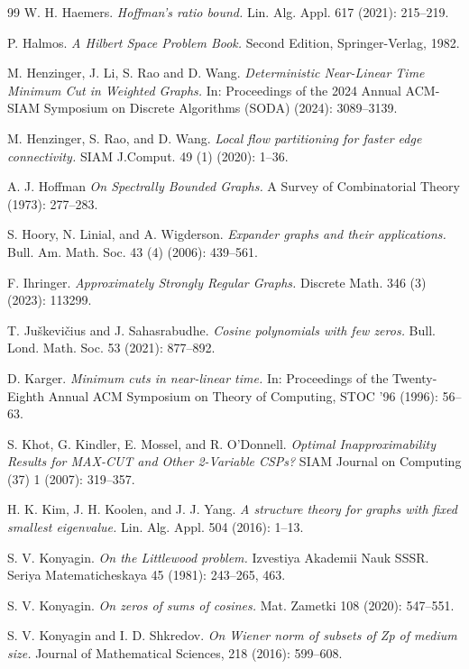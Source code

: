 \documentclass[11pt]{article}
\theoremstyle{plain}
\theoremstyle{definition}
\begin{document}
\begin{thebibliography}{99}
W. H. Haemers. 
\emph{Hoffman's ratio bound.}
Lin. Alg. Appl. 617 (2021): 215--219.

P. Halmos.
\emph{A Hilbert Space Problem Book.}
Second Edition, Springer-Verlag, 1982.

M. Henzinger, J. Li, S. Rao and D. Wang. 
\emph{Deterministic Near-Linear Time Minimum Cut
in Weighted Graphs.}
In: Proceedings of the 2024 Annual ACM-SIAM Symposium on Discrete Algorithms (SODA) (2024): 3089--3139.

M. Henzinger, S. Rao, and D. Wang.
\emph{Local flow partitioning for faster edge connectivity.}
SIAM J.Comput. 49 (1) (2020): 1--36.

A. J. Hoffman
\emph{On Spectrally Bounded Graphs.}
A Survey of Combinatorial Theory (1973): 277--283.

S. Hoory, N. Linial, and A. Wigderson.
\emph{Expander graphs and their applications.}
Bull. Am. Math. Soc. 43 (4) (2006): 439--561.
		
F. Ihringer.
\emph{Approximately Strongly Regular Graphs.}
Discrete Math. 346 (3) (2023): 113299.

 T. Ju\v skevi\v cius and J. Sahasrabudhe.
\emph{Cosine polynomials with few zeros.} 
Bull. Lond. Math. Soc. 53 (2021): 877--892.

D. Karger. 
\emph{Minimum cuts in near-linear time.}
In: Proceedings of the Twenty-Eighth Annual ACM Symposium on Theory of Computing, STOC '96 (1996): 56--63.

 S. Khot, G. Kindler, E.  Mossel, and R. O'Donnell.
 \emph{Optimal Inapproximability Results for MAX-CUT and Other 2-Variable CSPs?}
 SIAM Journal on Computing (37) 1 (2007): 319--357.

H. K. Kim, J. H. Koolen, and J. J. Yang.
\emph{A structure theory for graphs with fixed smallest eigenvalue.}
Lin. Alg. Appl. 504 (2016): 1--13.

S. V. Konyagin.
\emph{On the Littlewood problem.}
Izvestiya Akademii Nauk SSSR. Seriya Matematicheskaya 45 (1981): 243--265, 463.

S. V. Konyagin.
\emph{On zeros of sums of cosines.}
Mat. Zametki 108 (2020): 547--551.

S. V. Konyagin and I. D. Shkredov.
\emph{On Wiener norm of subsets of Zp of medium size.}
Journal of Mathematical Sciences, 218 (2016): 599--608.


\end{thebibliography}
\end{document}
